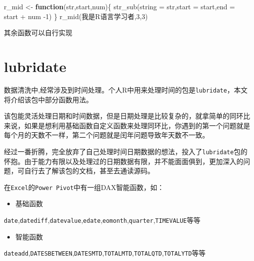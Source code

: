 \documentclass[
]{book}
\newenvironment{Shaded}{\begin{snugshade}}{\end{snugshade}}
\newcommand{\AttributeTok}[1]{\textcolor[rgb]{0.77,0.63,0.00}{#1}}
\newcommand{\ControlFlowTok}[1]{\textcolor[rgb]{0.13,0.29,0.53}{\textbf{#1}}}
\newcommand{\DecValTok}[1]{\textcolor[rgb]{0.00,0.00,0.81}{#1}}
\newcommand{\FunctionTok}[1]{\textcolor[rgb]{0.00,0.00,0.00}{#1}}
\newcommand{\NormalTok}[1]{#1}
\newcommand{\OtherTok}[1]{\textcolor[rgb]{0.56,0.35,0.01}{#1}}
\newcommand{\SpecialCharTok}[1]{\textcolor[rgb]{0.00,0.00,0.00}{#1}}
\newcommand{\StringTok}[1]{\textcolor[rgb]{0.31,0.60,0.02}{#1}}
\providecommand{\tightlist}{%
  \setlength{\itemsep}{0pt}\setlength{\parskip}{0pt}}
\begin{document}
\begin{Shaded}
\begin{Highlighting}[]
\NormalTok{r\_mid }\OtherTok{\textless{}{-}} \ControlFlowTok{function}\NormalTok{(str,start,num)\{}
  \FunctionTok{str\_sub}\NormalTok{(}\AttributeTok{string =}\NormalTok{ str,}\AttributeTok{start =}\NormalTok{ start,}\AttributeTok{end =}\NormalTok{ start }\SpecialCharTok{+}\NormalTok{ num }\SpecialCharTok{{-}}\DecValTok{1}\NormalTok{)}
\NormalTok{\}}
\FunctionTok{r\_mid}\NormalTok{(}\StringTok{\textquotesingle{}我是R语言学习者\textquotesingle{}}\NormalTok{,}\DecValTok{3}\NormalTok{,}\DecValTok{3}\NormalTok{)}
\end{Highlighting}
\end{Shaded}

其余函数可以自行实现

\hypertarget{lubridate}{%
\chapter{lubridate}\label{lubridate}}

数据清洗中,经常涉及到时间处理。个人R中用来处理时间的包是\texttt{lubridate}，本文将介绍该包中部分函数用法。

该包能灵活处理日期和时间数据，但是日期处理是比较复杂的，就拿简单的同环比来说，如果是想利用基础函数自定义函数来处理同环比，你遇到的第一个问题就是每个月的天数不一样，第二个问题就是闰年问题导致年天数不一致。

经过一番折腾，完全放弃了自己处理时间日期数据的想法，投入了\texttt{lubridate}包的怀抱。由于能力有限以及处理过的日期数据有限，并不能面面俱到，更加深入的问题，可自行去了解该包的文档，甚至去通读源码。

在\texttt{Excel}的\texttt{Power\ Pivot}中有一组DAX智能函数，如：

\begin{itemize}
\tightlist
\item
  基础函数
\end{itemize}

\texttt{date},\texttt{datediff},\texttt{datevalue},\texttt{edate},\texttt{eomonth},\texttt{quarter},\texttt{TIMEVALUE}等等

\begin{itemize}
\tightlist
\item
  智能函数
\end{itemize}

\texttt{dateadd},\texttt{DATESBETWEEN},\texttt{DATESMTD},\texttt{TOTALMTD},\texttt{TOTALQTD},\texttt{TOTALYTD}等等
\end{document}
